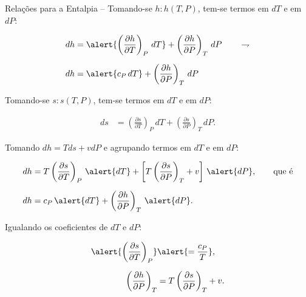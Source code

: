     \begin{frame}[allowframebreaks]{Relações para a Entalpia --}\vspace*{-0em}
        Tomando-se \alert{$h\!:\!h(T, P)$}, tem-se termos em \alert{$dT$} e em \alert{$dP$}:

        \begin{align*}
            dh  &= 
                \alert{\left(\frac{\partial h}{\partial T}\right)_P\,dT} +
                \left(\frac{\partial h}{\partial P}\right)_T\,dP
            \qquad\rightharpoondown
            \\[\medskipamount]
            dh  &=
                \alert{c_P\,dT} +
                \left(\frac{\partial h}{\partial P}\right)_T\,dP
        \end{align*}

        Tomando-se \alert{$s\!:\!s(T, P)$}, tem-se termos em \alert{$dT$} e em \alert{$dP$}:

        \begin{align*}
            ds  &= 
                \left(\frac{\partial s}{\partial T}\right)_P\,dT +
                \left(\frac{\partial s}{\partial P}\right)_T\,dP.
        \end{align*}

        Tomando \alert{$dh = Tds + vdP$} e agrupando termos em \alert{$dT$} e em \alert{$dP$}:

        \begin{align*}
            dh  &=
                T\left(\frac{\partial s}{\partial T}\right)_P\,\alert{dT} +
                \left[
                    T\left(\frac{\partial s}{\partial P}\right)_T + v
                \right]\,\alert{dP},
            \qquad\mbox{que é}
            \\[\medskipamount]
            dh  &=
                c_P\,\alert{dT} +
                \left(\frac{\partial h}{\partial P}\right)_T\,\alert{dP}.
        \end{align*}

        \pagebreak
        Igualando os coeficientes de \alert{$dT$} e \alert{$dP$}:

        \begin{align*}
            \alert{\left(\frac{\partial s}{\partial T}\right)_P}
            &\alert{= \frac{c_P}{T}},
            \\[\medskipamount]
            \left(\frac{\partial h}{\partial P}\right)_T
            &= T\left(\frac{\partial s}{\partial P}\right)_T + v.
        \end{align*}


\end{frame}
